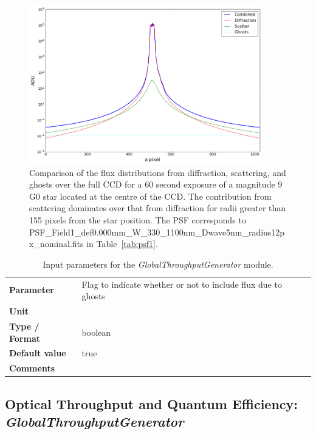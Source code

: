 \documentclass[11pt]{article}      %
\def\HCode#1{}
\def\htmlanchor#1{\HCode{<a id="#1"></a>}}
\begin{document}
\begin{figure}[htbp]
  \begin{center}
    \includegraphics[width=0.9\textwidth]{haloComparison_triangular.png}
    \caption{Comparison of the flux distributions from diffraction, scattering, and ghosts over the full CCD for a 60 second exposure of a magnitude 9 G0 star located at the centre of the CCD. The contribution from scattering dominates over that from diffraction for radii greater than 155 pixels from the star position. The PSF corresponds to PSF\_Field1\_def0.000mm\_W\_330\_1100nm\_Dwave5nm\_radius12px\_nominal.fits in Table~\ref{tab:psf1}.}
    \label{fig:haloComparison}
  \end{center}
\end{figure}

\begin{table}[hb]
  \caption{Input parameters for the {\it GlobalThroughputGenerator} module.}

 \htmlanchor{doGhosts}
  \begin{tabular}{| l | p{13cm} |}
    \hline 
    {\bf Parameter} & Flag to indicate whether or not to include flux due to ghosts\\
    {\bf Unit} & \\
    {\bf Type / Format} & boolean\\
    {\bf Default value} & true\\
    {\bf Comments} & \\
    \hline
  \end{tabular}
  \bigskip

  \label{tab:halo}
\end{table}

\clearpage
\htmlanchor{GlobalThroughputGenerator}
\subsection{Optical Throughput and Quantum Efficiency:  {\it GlobalThroughputGenerator}}
\label{sec:GlobalThroughputGenerator}
\end{document}
